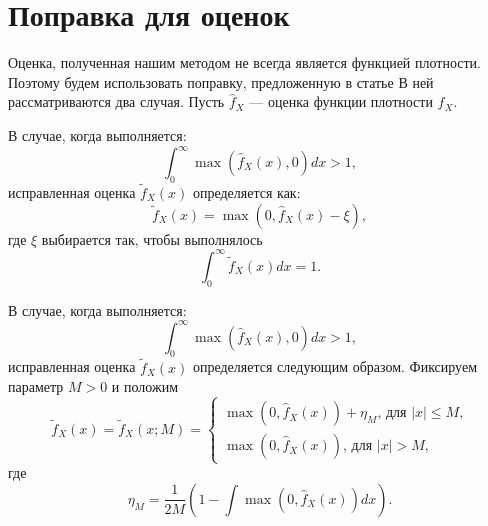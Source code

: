\documentclass[../paper.tex]{subfiles}
\begin{document}
\section{Поправка для оценок}\label{correction}
Оценка, полученная нашим методом не всегда является функцией плотности.
Поэтому будем использовать поправку, предложенную в статье \cite{correction-of-density-estimation}
В ней рассматриваются два случая. Пусть $\hat{f}_X$ --- оценка функции плотности $f_X$.

В случае, когда выполняется:
\[
	\int_0^\infty \max(\hat{f}_X(x), 0) dx > 1
,\]
исправленная оценка $\tilde{f}_X(x)$ определяется как:
\[
	\tilde{f}_X(x) = \max(0, \hat{f}_X(x) - \xi),
\]
где $\xi$ выбирается так, чтобы выполнялось
\[
	\int_0^\infty \tilde{f}_X(x) dx = 1
.\]

В случае, когда выполняется:
\[
	\int_0^\infty \max(\hat{f}_X(x), 0) dx > 1
,\]
исправленная оценка $\tilde{f}_X(x)$ определяется следующим образом. Фиксируем параметр $M > 0$ и положим
\[
	\tilde{f}_X(x)
	= \tilde{f}_X(x; M) =
	\begin{cases}
		\max(0, \hat{f}_X(x)) + \eta_M \text{, для $|x| \leqslant M$,} \\
		\max(0, \hat{f}_X(x)) \text{, для $|x| > M$,}
	\end{cases}
\]
где
\[
  \eta_M = \frac{1}{2M} \left( 1 - \int \max(0, \hat{f}_X(x)) dx \right)
.\]
\end{document}
